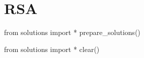 \chapter{RSA}


\newpage
\newpage
\newpage
\newpage
\newpage
\newpage
\newpage
\newpage
\newpage
\newpage
\newpage
\newpage
\newpage

\begin{python0}
from solutions import *
prepare_solutions()
\end{python0}

\begin{python0}
from solutions import *
clear()
\end{python0}
